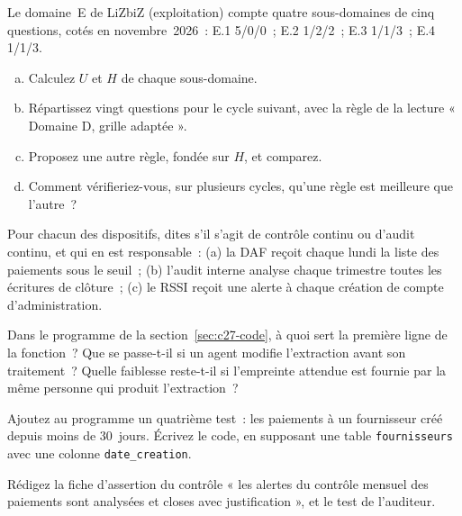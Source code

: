 \begin{boxexo}[title={\ding{45}\quad Exercice~27.3. Une grille adaptative pour le domaine E \niveauexpert}]
Le domaine~E de LiZbiZ (exploitation) compte quatre sous-domaines de cinq
questions, cotés en novembre~2026~: E.1 5/0/0~; E.2 1/2/2~; E.3 1/1/3~;
E.4 1/1/3.
\begin{enumerate}[(a)]
    \item Calculez $U$ et $H$ de chaque sous-domaine.
    \item Répartissez vingt questions pour le cycle suivant, avec la règle
          de la lecture « Domaine D, grille adaptée ».
    \item Proposez une autre règle, fondée sur $H$, et comparez.
    \item Comment vérifieriez-vous, sur plusieurs cycles, qu'une règle est
          meilleure que l'autre~?
\end{enumerate}
\end{boxexo}

\bigskip

\begin{boxexo}[title={\ding{45}\quad Exercice~27.4. Contrôle ou audit continu~? \niveaubase}]
Pour chacun des dispositifs, dites s'il s'agit de contrôle continu ou
d'audit continu, et qui en est responsable~: (a) la DAF reçoit chaque lundi
la liste des paiements sous le seuil~; (b) l'audit interne analyse chaque
trimestre toutes les écritures de clôture~; (c) le RSSI reçoit une alerte à
chaque création de compte d'administration.
\end{boxexo}

\begin{boxexo}[title={\ding{45}\quad Exercice~27.5. Lire le programme \niveaumoyen}]
Dans le programme de la section~\ref{sec:c27-code}, à quoi sert la
première ligne de la fonction~? Que se passe-t-il si un agent modifie
l'extraction avant son traitement~? Quelle faiblesse reste-t-il si
l'empreinte attendue est fournie par la même personne qui produit
l'extraction~?
\end{boxexo}

\begin{boxexo}[title={\ding{45}\quad Exercice~27.6. Ajouter un test \niveaumoyen}]
Ajoutez au programme un quatrième test~: les paiements à un fournisseur
créé depuis moins de 30~jours. Écrivez le code, en supposant une table
\texttt{fournisseurs} avec une colonne \texttt{date\_creation}.
\end{boxexo}

\begin{boxexo}[title={\ding{45}\quad Exercice~27.7. Auditer un contrôle continu \niveaumoyen}]
Rédigez la fiche d'assertion du contrôle « les alertes du contrôle
mensuel des paiements sont analysées et closes avec justification », et
le test de l'auditeur.
\end{boxexo}

